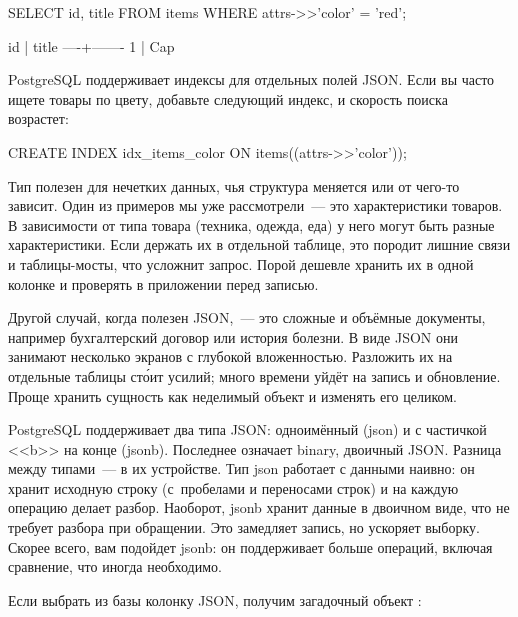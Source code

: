 \begin{english}
  \begin{sql}
SELECT id, title FROM items
WHERE attrs->>'color' = 'red';

 id | title
----+-------
  1 | Cap
  \end{sql}
\end{english}

PostgreSQL поддерживает индексы для отдельных полей JSON. Если вы часто ищете товары по цвету, добавьте следующий индекс, и скорость поиска возрастет:

\begin{english}
  \begin{sql}
CREATE INDEX idx_items_color
  ON items((attrs->>'color'));
  \end{sql}
\end{english}

Тип  полезен для нечетких данных, чья структура меняется или от чего-то зависит. Один из примеров мы уже рассмотрели~--- это характеристики товаров. В зависимости от типа товара (техника, одежда, еда) у него могут быть разные характеристики. Если держать их в отдельной таблице, это породит лишние связи и таблицы-мосты, что усложнит запрос. Порой дешевле хранить их в одной колонке  и проверять в приложении перед записью.

Другой случай, когда полезен JSON,~--- это сложные и объёмные документы, например бухгалтерский договор или история болезни. В виде JSON они занимают несколько экранов с глубокой вложенностью. Разложить их на отдельные таблицы ст\'{о}ит усилий; много времени уйдёт на запись и обновление. Проще хранить сущность как неделимый объект и изменять его целиком.


PostgreSQL поддерживает два типа JSON: одноимённый (json) и с частичкой <<b>> на конце (jsonb). Последнее означает binary, двоичный JSON. Разница между типами~--- в их устройстве. Тип json работает с данными наивно: он хранит исходную строку (с~пробелами и переносами строк) и на каждую операцию делает разбор. Наоборот, jsonb хранит данные в двоичном виде, что не требует разбора при обращении. Это замедляет запись, но ускоряет выборку. Скорее всего, вам подойдет jsonb: он поддерживает больше операций, включая сравнение, что иногда необходимо.


Если выбрать из базы колонку JSON, получим загадочный объект :

